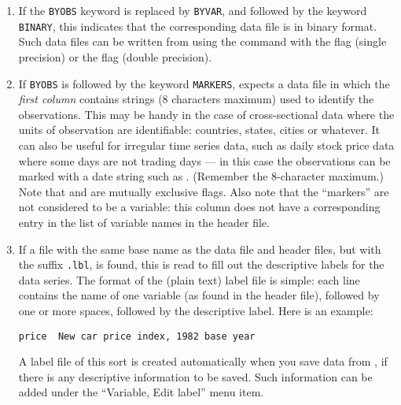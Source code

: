 \begin{enumerate}
\item If the \verb+BYOBS+ keyword is
	    replaced by \verb+BYVAR+, and followed by the
	    keyword \verb+BINARY+, this indicates that the
	    corresponding data file is in binary format.  Such data
	    files can be written from
	     using the
	     command with the
	     flag (single precision) or the
	     flag (double
	    precision).


\item If \verb+BYOBS+ is followed by the
	    keyword \verb+MARKERS+,
	     expects a data file in
	    which the \emph{first column} contains strings (8
	    characters maximum) used to identify the observations.
	    This may be handy in the case of cross-sectional data
	    where the units of observation are identifiable:
	    countries, states, cities or whatever.  It can also be
	    useful for irregular time series data, such as daily stock
	    price data where some days are not trading days --- in
	    this case the observations can be marked with a date
	    string such as .  (Remember the
	    8-character maximum.)  Note that  and
	     are mutually exclusive flags. Also note
	    that the ``markers'' are not considered to be a
	    variable: this column does not have a corresponding entry
	    in the list of variable names in the header
	    file.


\item If a file with the same base name as the data
	    file and header files, but with the suffix
	    \verb+.lbl+, is found, this is read to fill
	    out the descriptive labels for the data series. The format
	    of the (plain text) label file is simple: each line
	    contains the name of one variable (as found in the header
	    file), followed by one or more spaces, followed by the
	    descriptive label. Here is an example: 

	    \verb+price  New car price index, 1982 base year+

	    A label file of this sort is created automatically when
	    you save data from , if
	    there is any descriptive information to be saved.  Such
	    information can be added under the ``Variable, Edit
	      label'' menu item.
	  


\end{enumerate}

